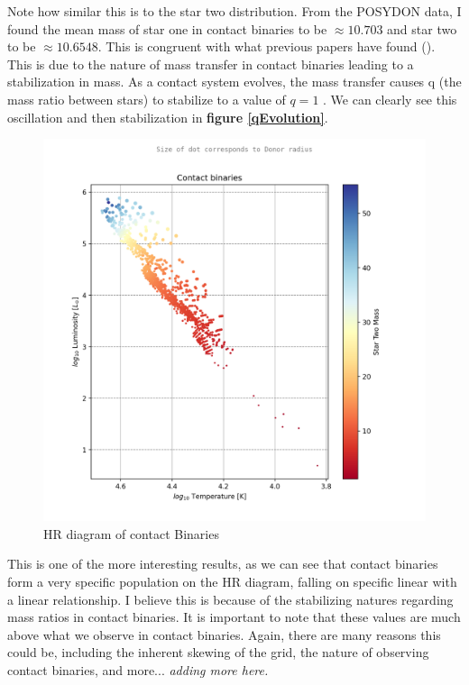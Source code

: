 \documentclass[12pt, letterpaper]{article}
\begin{document}
        Note how similar this is to the star two distribution. From the POSYDON data, I found the mean mass of star one in contact binaries to be $\approx 10.703$ and star two to be $\approx 10.6548$. This is congruent with what previous papers have found (\cite{Fabry_2025}). This is due to the nature of mass transfer in contact binaries leading to a stabilization in mass. As a contact system evolves, the mass transfer causes q (the mass ratio between stars) to stabilize to a value of $q=1$ \cite{Fabry_2025}. We can clearly see this oscillation and then stabilization in \textbf{figure \ref{qEvolution}}.

        \begin{figure}[H]
            \centering
            \includegraphics[scale = .6]{figs/Generated Figs/ Contact binaries Star Two Mass log10 F star radius T.png}
            \caption{HR diagram of contact Binaries}
            \label{contactBinaryHRDiagram}
        \end{figure}

        This is one of the more interesting results, as we can see that contact binaries form a very specific population on the HR diagram, falling on specific linear with a linear relationship. I believe this is because of the stabilizing natures regarding mass ratios in contact binaries. It is important to note that these values are much above what we observe in contact binaries. Again, there are many reasons this could be, including the inherent skewing of the grid, the nature of observing contact binaries, and more... \textit{adding more here.} 
\end{document}
